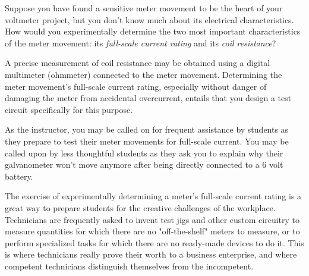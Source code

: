 

Suppose you have found a sensitive meter movement to be the heart of your voltmeter project, but you don't know much about its electrical characteristics.  How would you experimentally determine the two most important characteristics of the meter movement: its {\it full-scale current rating} and its {\it coil resistance}?







A precise measurement of coil resistance may be obtained using a digital multimeter (ohmmeter) connected to the meter movement.  Determining the meter movement's full-scale current rating, especially without danger of damaging the meter from accidental overcurrent, entails that you design a test circuit specifically for this purpose.







As the instructor, you may be called on for frequent assistance by students as they prepare to test their meter movements for full-scale current.  You may be called upon by less thoughtful students as they ask you to explain why their galvanometer won't move anymore after being directly connected to a 6 volt battery.

The exercise of experimentally determining a meter's full-scale current rating is a great way to prepare students for the creative challenges of the workplace.  Technicians are frequently asked to invent test jigs and other custom circuitry to measure quantities for which there are no "off-the-shelf" meters to measure, or to perform specialized tasks for which there are no ready-made devices to do it.  This is where technicians really prove their worth to a business enterprise, and where competent technicians distinguish themselves from the incompetent.



